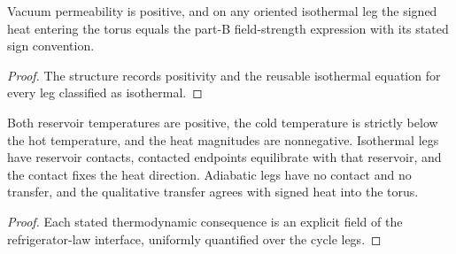 \begin{definition}
  \label{def:physics:IPhO_2026_3_C_1:aux020}
  Vacuum permeability is positive, and on any oriented isothermal leg the
  signed heat entering the torus equals the part-B field-strength expression
  with its stated sign convention.
\end{definition}
\begin{proof}
  The structure records positivity and the reusable isothermal equation for
  every leg classified as isothermal.
\end{proof}

\begin{definition}
  \label{def:physics:IPhO_2026_3_C_1:aux021}
  Both reservoir temperatures are positive, the cold temperature is strictly
  below the hot temperature, and the heat magnitudes are nonnegative.
  Isothermal legs have reservoir contacts, contacted endpoints equilibrate
  with that reservoir, and the contact fixes the heat direction.  Adiabatic
  legs have no contact and no transfer, and the qualitative transfer agrees
  with signed heat into the torus.
\end{definition}
\begin{proof}
  Each stated thermodynamic consequence is an explicit field of the
  refrigerator-law interface, uniformly quantified over the cycle legs.
\end{proof}

